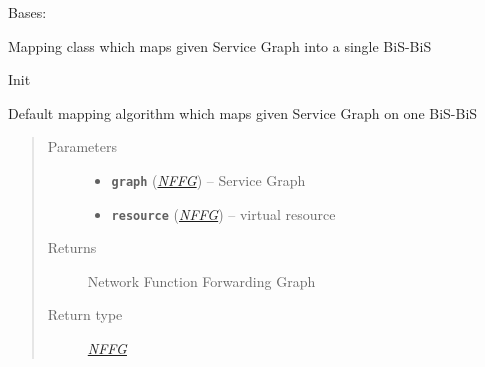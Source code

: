 \documentclass[letterpaper,10pt,english]{sphinxmanual}
\begin{document}
\begin{fulllineitems}
\label{service/sas_mapping:escape.service.sas_mapping.DefaultServiceMappingStrategy}
Bases: {\hyperref[util/mapping:escape.util.mapping.AbstractMappingStrategy]{\emph{}}}

Mapping class which maps given Service Graph into a single BiS-BiS

\begin{fulllineitems}
\label{service/sas_mapping:escape.service.sas_mapping.DefaultServiceMappingStrategy.__init__}
Init

\end{fulllineitems}


\begin{fulllineitems}
\label{service/sas_mapping:escape.service.sas_mapping.DefaultServiceMappingStrategy.map}
Default mapping algorithm which maps given Service Graph on one BiS-BiS
\begin{quote}\begin{description}
\item[{Parameters}] \leavevmode\begin{itemize}
\item {} 
\textbf{\texttt{graph}} ({\hyperref[util/nffg:escape.util.nffg.NFFG]{\emph{\emph{NFFG}}}}) -- Service Graph

\item {} 
\textbf{\texttt{resource}} ({\hyperref[util/nffg:escape.util.nffg.NFFG]{\emph{\emph{NFFG}}}}) -- virtual resource

\end{itemize}

\item[{Returns}] \leavevmode
Network Function Forwarding Graph

\item[{Return type}] \leavevmode
{\hyperref[util/nffg:escape.util.nffg.NFFG]{\emph{NFFG}}}

\end{description}\end{quote}

\end{fulllineitems}


\end{fulllineitems}
\end{document}
